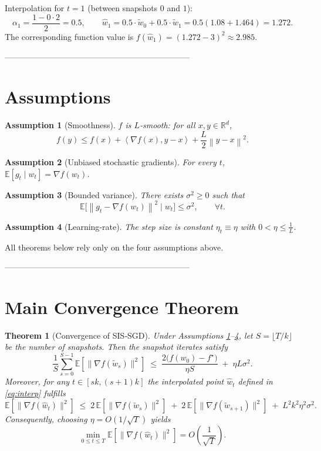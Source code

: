 \documentclass{article}
\newtheorem{theorem}{Theorem}
\newtheorem{assumption}{Assumption}
\newcommand{\EE}{\mathbb{E}}
\newcommand{\RR}{\mathbb{R}}
\newcommand{\norm}[1]{\left\|#1\right\|}
\newcommand{\inner}[2]{\left\langle #1,#2\right\rangle}
\begin{document}
Interpolation for $t=1$ (between snapshots $0$ and $1$):
\[
\alpha_1=\frac{1-0\cdot2}{2}=0.5,\qquad \hat w_1=0.5\cdot\tilde w_{0}+0.5\cdot\tilde w_{1}=0.5(1.08+1.464)=1.272.
\]
The corresponding function value is $f(\hat w_1)=(1.272-3)^2\approx2.985$.

--------------------------------------------------------------------

\section*{Assumptions}
\begin{assumption}[Smoothness]\label{ass:smooth}
$f$ is $L$‑smooth: for all $x,y\in\RR^{d}$,
\[
f(y)\le f(x)+\inner{\nabla f(x)}{y-x}+\frac{L}{2}\norm{y-x}^2 .
\]
\end{assumption}
\begin{assumption}[Unbiased stochastic gradients]\label{ass:unbiased}
For every $t$, $\EE[g_t\mid w_t]=\nabla f(w_t)$.
\end{assumption}
\begin{assumption}[Bounded variance]\label{ass:var}
There exists $\sigma^2\ge0$ such that
\[
\EE\bigl[\norm{g_t-\nabla f(w_t)}^2\mid w_t\bigr]\le\sigma^2,\qquad\forall t .
\]
\end{assumption}
\begin{assumption}[Learning‑rate]\label{ass:lr}
The step size is constant $\eta_t\equiv\eta$ with $0<\eta\le \frac{1}{L}$.
\end{assumption}
All theorems below rely only on the four assumptions above.

--------------------------------------------------------------------

\section*{Main Convergence Theorem}
\begin{theorem}[Convergence of SIS‑SGD]\label{thm:main}
Under Assumptions \ref{ass:smooth}–\ref{ass:lr}, let $S=\lfloor T/k\rfloor$ be the number of snapshots.
Then the snapshot iterates satisfy
\begin{equation}
\frac{1}{S}\sum_{s=0}^{S-1}\EE\!\left[\bigl\|\nabla f(\tilde w_{s})\bigr\|^2\right]
\;\le\;
\frac{2\bigl(f(w_0)-f^{\star}\bigr)}{\eta S}
\;+\;
\eta L\sigma^2 .
\label{eq:snapshot-rate}
\end{equation}
Moreover, for any $t\in[sk,(s+1)k]$ the interpolated point $\hat w_t$ defined in \eqref{eq:interp} fulfills
\begin{equation}
\EE\!\left[\bigl\|\nabla f(\hat w_t)\bigr\|^2\right]
\;\le\;
2\,\EE\!\left[\bigl\|\nabla f(\tilde w_{s})\bigr\|^2\right]
\;+\;
2\,\EE\!\left[\bigl\|\nabla f(\tilde w_{s+1})\bigr\|^2\right]
\;+\;
L^2k^2\eta^2\sigma^2 .
\label{eq:interp-rate}
\end{equation}
Consequently, choosing $\eta=O(1/\sqrt{T})$ yields
\[
\min_{0\le t\le T}\EE\!\left[\bigl\|\nabla f(\hat w_t)\bigr\|^2\right]=O\!\left(\frac{1}{\sqrt{T}}\right).
\]
\end{theorem}
\end{document}
